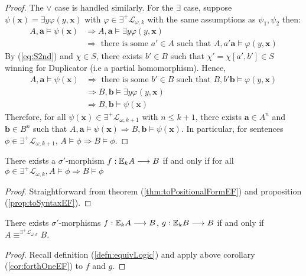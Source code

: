 \begin{prop}
\begin{proof}
The $\vee$ case is handled similarly. For the $\exists$ case, suppose $\psi(\mathbf{x}) = \exists y \varphi(y,\mathbf{x})$ with $\varphi \in \exists^{+}\mathcal{L}_{\omega,k}$ with the same assumptions as $\psi_{1},\psi_{2}$ then:  
\begin{align*}
A,\mathbf{a} \vDash \psi(\mathbf{x}) &\Rightarrow A,\mathbf{a} \vDash \exists y \varphi(y,\mathbf{x}) \\ 
&\Rightarrow \text{ there is some } a' \in A \text{ such that } A,a'\mathbf{a} \vDash \varphi(y,\mathbf{x}) 
\end{align*}
By (\ref{eq:S2nd}) and $\chi \in S$, there exists $b' \in B$ such that $\chi' = \chi[a',b'] \in S$ winning for Duplicator (i.e a partial homomorphism). Hence,
\begin{align*}
A,\mathbf{a} \vDash \psi(\mathbf{x}) &\Rightarrow \text{ there is some } b' \in B \text{ such that } B,b'\mathbf{b} \vDash \varphi(y,\mathbf{x}) \\  
&\Rightarrow B,\mathbf{b} \vDash \exists y \varphi(y,\mathbf{x}) \\  
&\Rightarrow B,\mathbf{b} \vDash \psi(\mathbf{x})   
\end{align*}
Therefore, for all $\psi(\mathbf{x}) \in \exists^{+}\mathcal{L}_{\omega,k+1}$ with $n \leq k+1$, there exists $\mathbf{a} \in A^{n}$ and $\mathbf{b} \in B^{n}$ such that $A,\mathbf{a} \vDash \psi(\mathbf{x}) \Rightarrow B,\mathbf{b} \vDash \psi(\mathbf{x})$. In particular, for sentences $\phi \in \exists^{+}\mathcal{L}_{\omega,k+1}$, $A \vDash \phi \Rightarrow B \vDash \phi$. 
\end{proof}
\begin{cor}
There exists a $\sigma'$-morphism $f:{\mathbb{E}_{k}A} \longrightarrow B$ if and only if for all $\phi \in \exists^{+}\mathcal{L}_{\omega,k}, A \vDash \phi \Rightarrow B \vDash \phi$
\begin{proof}
Straightforward from theorem (\ref{thm:toPositionalFormEF}) and proposition (\ref{prop:toSyntaxEF}).
\end{proof}
\label{cor:forthOneEF}
\end{cor}
\begin{cor}
There exists $\sigma'$-morphisms $f:{\mathbb{E}_{k}A} \longrightarrow B$, $g:{\mathbb{E}_{k}B} \longrightarrow B$ if and only if $A \equiv^{\exists^{+}\mathcal{L}_{\omega,k}} B$. 
\begin{proof}
Recall definition (\ref{defn:equivLogic}) and apply above corollary (\ref{cor:forthOneEF}) to $f$ and $g$.  
\end{proof}
\label{cor:forthEF}
\end{cor}
\label{prop:toSyntaxEF}
\end{prop}
